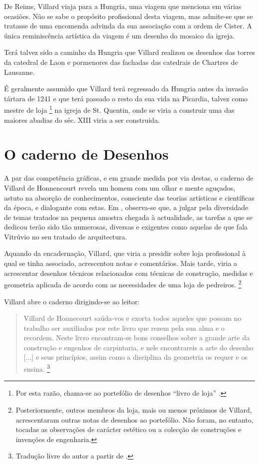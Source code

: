 \documentclass{article}
\begin{document}
De Reims, Villard viaja para a Hungria, uma viagem que menciona em
várias ocasiões. Não se sabe o propósito profissional desta viagem,
mas admite-se que se tratasse de uma encomenda advinda da sua
associação com a ordem de Cister. A única reminiscência artística da
viagem é um desenho do mosaico da igreja.

Terá talvez sido a caminho da Hungria que Villard realizou os desenhos
das torres da catedral de Laon e pormenores das fachadas das catedrais
de Chartres de Lausanne.

É geralmente assumido \cite{teresa} que Villard terá regressado da
Hungria antes da invasão tártara de 1241 e que terá passado o resto da
sua vida na Picardia, talvez como mestre de loja \footnote{Por esta
  razão, chama-se ao portefólio de desenhos ``livro de loja''
  \cite{teresa}.} na igreja de St. Quentin, onde se viria a construir
uma das maiores abadias do séc. XIII viria a ser construida.

\section{O caderno de Desenhos}

A par das competência gráficas, e em grande medida por via destas, o
caderno de Villard de Honnencourt revela um homem com um olhar e mente
aguçados, astuto na absorção de conhecimentos, consciente das teorias
artísticas e científicas da época, e dialogante com estas. Em
\cite{teresa}, observa-se que, a julgar pela diversidade de
temas tratados na pequena amostra chegada à actualidade, as tarefas a
que se dedicou terão sido tão numerosas, diversas e exigentes como
aquelas de que fala Vitrúvio no seu tratado de arquitectura.

Aquando da encadernação, Villard, que viria a presidir sobre loja
profissional à qual se tinha associado, acrescentou notas e
comentários. Mais tarde, viria a acrescentar desenhos técnicos
relacionados com técnicas de construção, medidas e geometria aplicada
de acordo com as necessidades de uma loja de
pedreiros. \footnote{Posteriormente, outros membros da loja, mais ou
  menos próximos de Villard, acrescentaram outras notas de desenhos ao
  portefólio. Não foram, no entanto, tocadas as observações de
  carácter estético ou a colecção de construções e invenções de
  engenharia.}

Villard abre o caderno dirigindo-se ao leitor:

\begin{quote} Villard de Honnecourt saúda-vos e exorta todos aqueles
que possam no trabalho ser auxiliados por este livro que rezem pela
sua alma e o recordem. Neste livro encontram-se bons conselhos sobre a
grande arte da construção e engenhos de carpintaria, e nele
encontrareis a arte do desenho [...] e seus princípios, assim como a
disciplina da geometria os requer e os ensina. \footnote{Tradução
  livre do autor a partir de \cite{teresa}.}
\end{quote}
\end{document}
